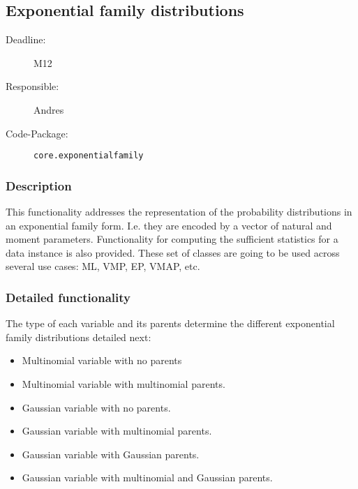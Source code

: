 \newpage
\subsection{Exponential family distributions}
\label{Functionality:ID}

\begin{description}
\item[Deadline:] M12
\item[Responsible:] Andres
\item[Code-Package:] \texttt{core.exponentialfamily}
\end{description}

\subsubsection*{Description}

This functionality addresses the representation of the probability distributions in an exponential family form. I.e. they are encoded by a vector of natural and moment parameters. Functionality for computing the sufficient statistics for a data instance is also provided. These set of classes are going to be used across several use cases:  ML, VMP, EP, VMAP, etc. 

\subsubsection*{Detailed functionality}

The type of each variable and its parents determine the different exponential family distributions detailed next:

\begin{itemize}
\item Multinomial variable with no parents
\item Multinomial variable with multinomial parents.
\item Gaussian variable with no parents.
\item Gaussian variable with multinomial parents.
\item Gaussian variable with Gaussian parents. 
\item Gaussian variable with multinomial and Gaussian parents. 

\end{itemize}